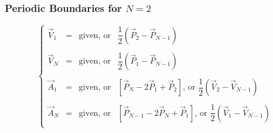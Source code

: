 \documentclass[aps,12pt]{revtex4}
\begin{document}
\subsubsection{Periodic Boundaries for $N=2$}
\begin{equation}
\left\lbrace
\begin{array}{rcll}
\vec{V}_1 & = & \text{given, or} & \dfrac{1}{2}\left(\vec{P}_2 - \vec{P}_{N-1}\right)\\ 
\\
\vec{V}_N & = & \text{given, or} & \dfrac{1}{2}\left(\vec{P}_1 - \vec{P}_{N-1}\right)\\
\\
\vec{A}_1 & = & \text{given, or} &   \left[\vec{P}_{N} - 2\vec{P}_{1} + \vec{P}_2\right]  \text{, or } \dfrac{1}{2}\left(\vec{V}_2 - \vec{V}_{N-1}\right)\\ 
\\
\vec{A}_N & = & \text{given, or} &    \left[\vec{P}_{N-1} - 2\vec{P}_N + \vec{P}_1\right] \text{, or }  \dfrac{1}{2}\left(\vec{V}_1 - \vec{V}_{N-1}\right)\\ 
\end{array} 
\right.
\end{equation}
\end{document}
